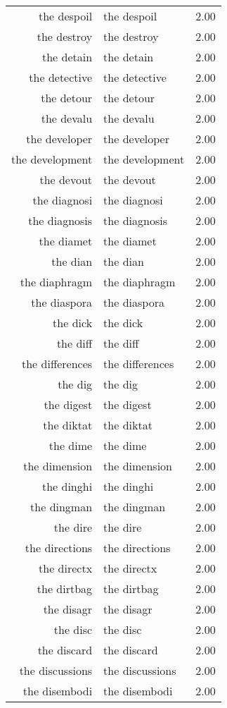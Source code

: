 \begin{table}[ht]
\begin{tabular}{rlr}
  the despoil & the despoil & 2.00 \\ 
  the destroy & the destroy & 2.00 \\ 
  the detain & the detain & 2.00 \\ 
  the detective & the detective & 2.00 \\ 
  the detour & the detour & 2.00 \\ 
  the devalu & the devalu & 2.00 \\ 
  the developer & the developer & 2.00 \\ 
  the development & the development & 2.00 \\ 
  the devout & the devout & 2.00 \\ 
  the diagnosi & the diagnosi & 2.00 \\ 
  the diagnosis & the diagnosis & 2.00 \\ 
  the diamet & the diamet & 2.00 \\ 
  the dian & the dian & 2.00 \\ 
  the diaphragm & the diaphragm & 2.00 \\ 
  the diaspora & the diaspora & 2.00 \\ 
  the dick & the dick & 2.00 \\ 
  the diff & the diff & 2.00 \\ 
  the differences & the differences & 2.00 \\ 
  the dig & the dig & 2.00 \\ 
  the digest & the digest & 2.00 \\ 
  the diktat & the diktat & 2.00 \\ 
  the dime & the dime & 2.00 \\ 
  the dimension & the dimension & 2.00 \\ 
  the dinghi & the dinghi & 2.00 \\ 
  the dingman & the dingman & 2.00 \\ 
  the dire & the dire & 2.00 \\ 
  the directions & the directions & 2.00 \\ 
  the directx & the directx & 2.00 \\ 
  the dirtbag & the dirtbag & 2.00 \\ 
  the disagr & the disagr & 2.00 \\ 
  the disc & the disc & 2.00 \\ 
  the discard & the discard & 2.00 \\ 
  the discussions & the discussions & 2.00 \\ 
  the disembodi & the disembodi & 2.00 \\ 

\end{tabular}
\end{table}
